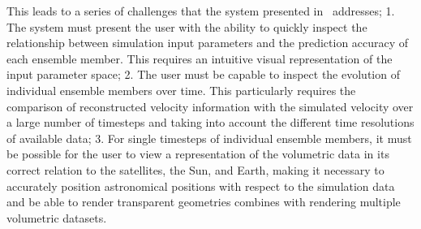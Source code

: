 This leads to a series of challenges that the system presented in \paperCME\ addresses;  1. The system must present the user with the ability to quickly inspect the relationship between simulation input parameters and the prediction accuracy of each ensemble member.  This requires an intuitive visual representation of the  input parameter space;  2. The user must be capable to inspect the evolution of individual ensemble members over time.  This particularly requires the comparison of reconstructed velocity information with the simulated velocity over a large number of timesteps and taking into account the different time resolutions of available data;  3. For single timesteps of individual ensemble members, it must be possible for the user to view a representation of the volumetric data in its correct relation to the satellites, the Sun, and Earth, making it necessary to accurately position astronomical positions with respect to the simulation data and be able to render transparent geometries combines with rendering multiple volumetric datasets.


